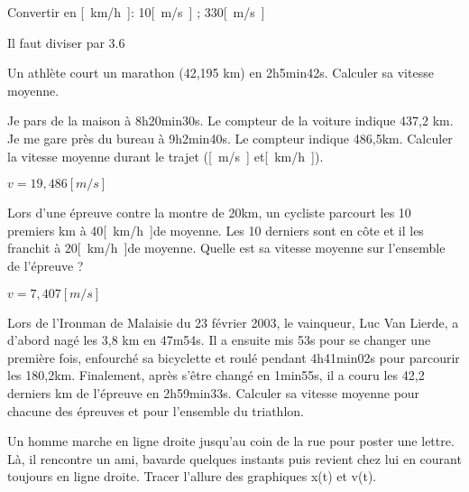 \begin{exercise}
    Convertir en \unit{[km/h]}: 10\unit{[m/s]} ; 330\unit{[m/s]}
\end{exercise}
\begin{solution}
    Il faut diviser par 3.6
\end{solution}


\begin{exercise}
    Un athlète court un marathon (42,195 km) en 2h5min42s. Calculer sa vitesse moyenne.
\end{exercise}
\begin{solution}
\end{solution}


\begin{exercise}
    Je pars de la maison à 8h20min30s. Le compteur de la voiture indique 437,2 km.
    Je me gare près du bureau à 9h2min40s. Le compteur indique 486,5km.
    Calculer la vitesse moyenne durant le trajet (\unit{[m/s]} et\unit{[km/h]}).
\end{exercise}
\begin{solution}
    \(v=19,486\unit{[m/s]}\)
\end{solution}


\begin{exercise}
    Lors d'une épreuve contre la montre de 20km, un cycliste parcourt les 10 premiers km à 40\unit{[km/h]}de moyenne. Les 10 derniers sont en côte et il les franchit à 20\unit{[km/h]}de moyenne. Quelle est sa vitesse moyenne sur l'ensemble de l'épreuve ?
\end{exercise}
\begin{solution}
    \(v=7,407\unit{[m/s]}\)
\end{solution}


\begin{exercise}
    Lors de l'Ironman de Malaisie du 23 février 2003, le vainqueur, Luc Van Lierde, a d'abord nagé les 3,8 km en 47m54s. Il a ensuite mis 53s pour se changer une première fois, enfourché sa bicyclette et roulé pendant 4h41min02s pour parcourir les 180,2km. Finalement, après s'être changé en 1min55s, il a couru les 42,2 derniers km de l'épreuve en 2h59min33s. Calculer sa vitesse moyenne pour chacune des épreuves et pour l'ensemble du triathlon.
\end{exercise}
\begin{solution}
\end{solution}


\begin{exercise}
    Un homme marche en ligne droite jusqu'au coin de la rue pour poster une lettre. Là, il rencontre un ami, bavarde quelques instants puis revient chez lui en courant toujours en ligne droite.
    Tracer l'allure des graphiques x(t) et v(t).
\end{exercise}
\begin{solution}
\end{solution}

